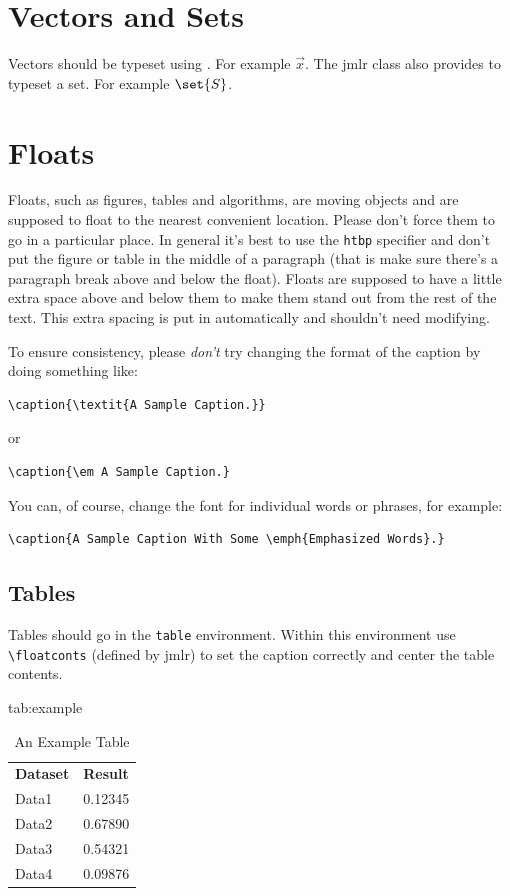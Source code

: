 \documentclass[pmlr]{jmlr}
\begin{document}
\section{Vectors and Sets}
\label{sec:vec}

Vectors should be typeset using . For example $\vec{x}$.
The \textsf{jmlr} class also provides  to typeset a
set. For example $\set{S}$.

\section{Floats}
\label{sec:floats}

Floats, such as figures, tables and algorithms, are moving
objects and are supposed to float to the nearest convenient
location. Please don't force them to go in a particular place. In
general it's best to use the \texttt{htbp} specifier and don't
put the figure or table in the middle of a paragraph (that is
make sure there's a paragraph break above and below the float).
Floats are supposed to have a little extra space above and below
them to make them stand out from the rest of the text. This extra
spacing is put in automatically and shouldn't need modifying.

To ensure consistency, please \emph{don't} try changing the format of the caption by doing
something like:
\begin{verbatim}
\caption{\textit{A Sample Caption.}}
\end{verbatim}
or
\begin{verbatim}
\caption{\em A Sample Caption.}
\end{verbatim}
You can, of course, change the font for individual words or 
phrases, for example:
\begin{verbatim}
\caption{A Sample Caption With Some \emph{Emphasized Words}.}
\end{verbatim}

\subsection{Tables}
\label{sec:tables}

Tables should go in the \texttt{table} environment. Within this
environment use \verb|\floatconts| (defined by \textsf{jmlr})
to set the caption correctly and center the table contents.

\begin{table}[htbp]
\floatconts
  {tab:example}%
  {\caption{An Example Table}}%
  {\begin{tabular}{ll}
  \bfseries Dataset & \bfseries Result\\
  Data1 & 0.12345\\
  Data2 & 0.67890\\
  Data3 & 0.54321\\
  Data4 & 0.09876
  \end{tabular}}
\end{table}
\end{document}
